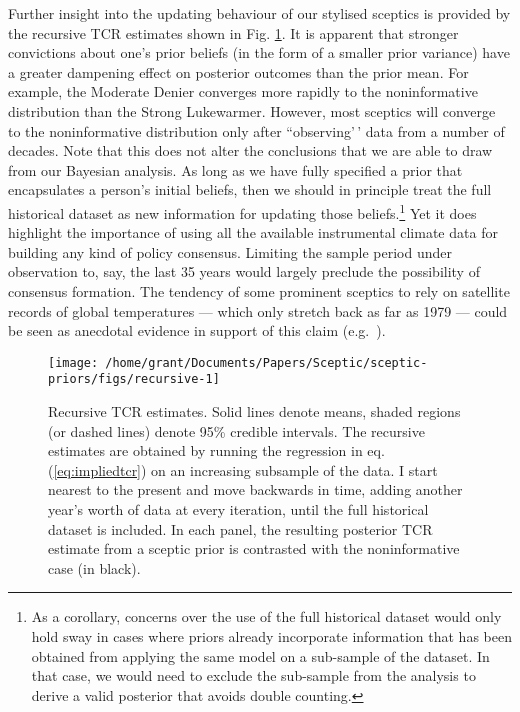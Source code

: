 \documentclass[smallextended]{svjour3}       %
\begin{document}
Further insight into the updating behaviour of our stylised sceptics is
provided by the recursive TCR estimates shown in Fig.
\ref{fig:recursive}. It is apparent that stronger convictions about
one's prior beliefs (in the form of a smaller prior variance) have a
greater dampening effect on posterior outcomes than the prior mean. For
example, the Moderate Denier converges more rapidly to the
noninformative distribution than the Strong Lukewarmer. However, most
sceptics will converge to the noninformative distribution only after
``observing'\,' data from a number of decades. Note that this does not
alter the conclusions that we are able to draw from our Bayesian
analysis. As long as we have fully specified a prior that encapsulates a
person's initial beliefs, then we should in principle treat the full
historical dataset as new information for updating those
beliefs.\footnote{As a corollary, concerns over the use of the full
  historical dataset would only hold sway in cases where priors already
  incorporate information that has been obtained from applying the same
  model on a sub-sample of the dataset. In that case, we would need to
  exclude the sub-sample from the analysis to derive a valid posterior
  that avoids double counting.} Yet it does highlight the importance of
using all the available instrumental climate data for building any kind
of policy consensus. Limiting the sample period under observation to,
say, the last 35 years would largely preclude the possibility of
consensus formation. The tendency of some prominent sceptics to rely on
satellite records of global temperatures --- which only stretch back as
far as 1979 --- could be seen as anecdotal evidence in support of this
claim (e.g.~\cite{mooney2016cruz}).

\begin{figure}

{\centering \texttt{[image: /home/grant/Documents/Papers/Sceptic/sceptic-priors/figs/recursive-1]} 

}

\caption{Recursive TCR estimates. Solid lines denote means, shaded regions (or dashed lines) denote 95\% credible intervals. The recursive estimates are obtained by running the regression in eq. (\ref{eq:impliedtcr}) on an increasing subsample of the data. I start nearest to the present and move backwards in time, adding another year's worth of data at every iteration, until the full historical dataset is included. In each panel, the resulting posterior TCR estimate from a sceptic prior is contrasted with the noninformative case (in black).}\label{fig:recursive}
\end{figure}
\end{document}
